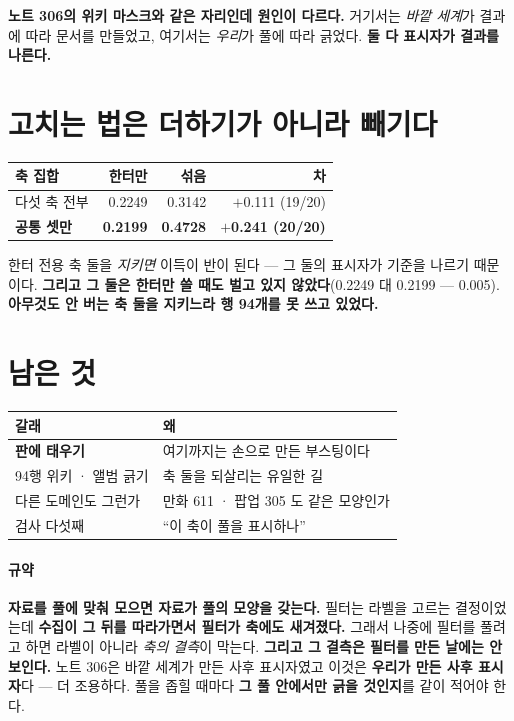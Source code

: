 \documentclass[10pt]{article}
\begin{document}
\textbf{노트 306의 위키 마스크와 같은 자리인데 원인이 다르다.} 거기서는
\emph{바깥 세계}가 결과에 따라 문서를 만들었고, 여기서는 \emph{우리}가
풀에 따라 긁었다. \textbf{둘 다 표시자가 결과를 나른다.}

\section{고치는 법은 더하기가 아니라 빼기다}

\begin{center}\small
\begin{tabular}{lrrr}
\hline
축 집합 & 한터만 & 섞음 & 차 \\
\hline
다섯 축 전부 & 0.2249 & 0.3142 & $+$0.111 (19/20) \\
\textbf{공통 셋만} & \textbf{0.2199} & \textbf{0.4728} & \textbf{$+$0.241 (20/20)} \\
\hline
\end{tabular}
\end{center}

한터 전용 축 둘을 \emph{지키면} 이득이 반이 된다 --- 그 둘의 표시자가
기준을 나르기 때문이다. \textbf{그리고 그 둘은 한터만 쓸 때도 벌고 있지
않았다}(0.2249 대 0.2199 --- 0.005). \textbf{아무것도 안 버는 축 둘을
지키느라 행 94개를 못 쓰고 있었다.}

\section{남은 것}
\begin{center}\footnotesize
\begin{tabular}{ll}
\hline
갈래 & 왜 \\
\hline
\textbf{판에 태우기} & 여기까지는 손으로 만든 부스팅이다 \\
94행 위키 · 앨범 긁기 & 축 둘을 되살리는 유일한 길 \\
다른 도메인도 그런가 & 만화 611 · 팝업 305 도 같은 모양인가 \\
검사 다섯째 & ``이 축이 풀을 표시하나'' \\
\hline
\end{tabular}
\end{center}

\paragraph{규약} \textbf{자료를 풀에 맞춰 모으면 자료가 풀의 모양을 갖는다.}
필터는 라벨을 고르는 결정이었는데 \textbf{수집이 그 뒤를 따라가면서 필터가
축에도 새겨졌다.} 그래서 나중에 필터를 풀려고 하면 라벨이 아니라
\emph{축의 결측}이 막는다. \textbf{그리고 그 결측은 필터를 만든 날에는
안 보인다.} 노트 306은 바깥 세계가 만든 사후 표시자였고 이것은 \textbf{우리가
만든 사후 표시자}다 --- 더 조용하다. 풀을 좁힐 때마다 \textbf{그 풀 안에서만
긁을 것인지}를 같이 적어야 한다.
\end{document}

